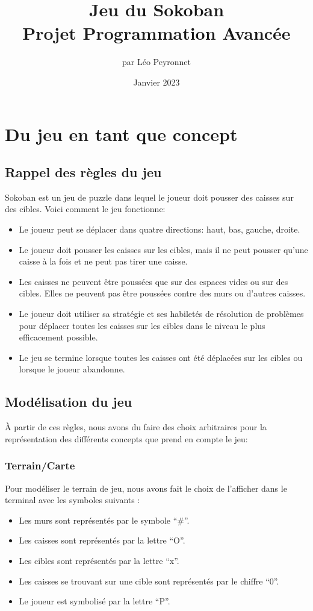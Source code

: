 \documentclass[10pt,a4paper,french,titlepage]{article}
\author{par Léo Peyronnet}
\title{Jeu du Sokoban\\[1ex] \large Projet Programmation Avancée}
\date{Janvier 2023}
\begin{document}
\maketitle
\tableofcontents
\newpage
\section{Du jeu en tant que concept}
\subsection{Rappel des règles du jeu}
Sokoban est un jeu de puzzle dans lequel le joueur doit pousser des caisses sur des cibles. Voici comment le jeu fonctionne:
\begin{itemize}
\item Le joueur peut se déplacer dans quatre directions: haut, bas, gauche, droite.
\item Le joueur doit pousser les caisses sur les cibles, mais il ne peut pousser qu'une caisse à la fois et ne peut pas tirer une caisse.
\item Les caisses ne peuvent être poussées que sur des espaces vides ou sur des cibles. Elles ne peuvent pas être poussées contre des murs ou d'autres caisses.
\item Le joueur doit utiliser sa stratégie et ses habiletés de résolution de problèmes pour déplacer toutes les caisses sur les cibles dans le niveau le plus efficacement possible.
\item Le jeu se termine lorsque toutes les caisses ont été déplacées sur les cibles ou lorsque le joueur abandonne.
\end{itemize}

\subsection{Modélisation du jeu}
À partir de ces règles, nous avons du faire des choix arbitraires pour la représentation des différents concepts que prend en compte le jeu:
\subsubsection{Terrain/Carte}
Pour modéliser le terrain de jeu, nous avons fait le choix de l’afficher dans le terminal avec les symboles suivants : 
\begin{itemize}
\item Les murs sont représentés par le symbole “{\#}”.
\item Les caisses sont représentés par la lettre “O”.
\item Les cibles sont représentés par la lettre “x”.
\item Les caisses se trouvant sur une cible sont représentés par le chiffre “0”.
\item Le joueur est symbolisé par la lettre “P”.
\end{itemize}
\end{document}
